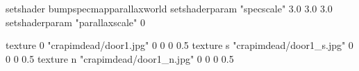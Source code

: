 setshader bumpspecmapparallaxworld
setshaderparam "specscale" 3.0 3.0 3.0
setshaderparam "parallaxscale" 0

texture 0 "crapimdead/door1.jpg" 0 0 0 0.5
texture s "crapimdead/door1_s.jpg" 0 0 0 0.5
texture n "crapimdead/door1_n.jpg" 0 0 0 0.5
